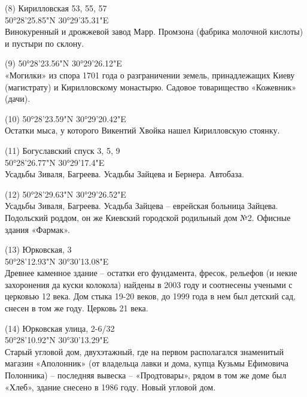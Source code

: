 \begin{flushleft}
\medskip

(8) Кирилловская 53, 55, 57\\
50°28'25.85"N 30°29'35.31"E\\
Винокуренный и дрожжевой завод Марр. Промзона (фабрика молочной кислоты) и пустыри по склону.\\

\medskip

(9) 50°28'23.56"N 30°29'26.12"E\\
«Могилки» из спора 1701 года о разграничении земель, принадлежащих Киеву (магистрату) и Кирилловскому монастырю. Садовое товарищество «Кожевник» (дачи).\\

\medskip

(10) 50°28'23.59"N 30°29'20.42"E\\
Остатки мыса, у которого Викентий Хвойка нашел Кирилловскую стоянку.\\

\medskip

(11) Богуславский спуск 3, 5, 9\\
50°28'26.77"N 30°29'17.4"E\\
Усадьбы Зиваля, Багреева. Усадьбы Зайцева и Бернера. Автобаза.\\

\medskip

(12) 50°28'29.63"N 30°29'26.52"E\\
Усадьбы Зиваля, Багреева. Усадьба Зайцева – еврейская больница Зайцева. Подольский роддом, он же Киевский городской родильный дом №2. Офисные здания «Фармак».\\

\medskip

(13) Юрковская, 3\\
50°28'12.93"N 30°30'13.08"E\\
Древнее каменное здание – остатки его фундамента, фресок, рельефов (и некие захоронения да куски колокола) найдены в 2003 году и соотнесены учеными с церковью 12 века. Дом стыка 19-20 веков, до 1999 года в нем был детский сад, снесен в том же году. Церковь 21 века.\\

\medskip

(14) Юрковская улица, 2-6/32\\
50°28'10.92"N 30°30'13.29"E\\
Старый угловой дом, двухэтажный, где на первом располагался знаменитый магазин «Аполонник» (от владельца лавки и дома, купца Кузьмы Ефимовича Полонника) – последняя вывеска – «Продтовары», рядом в том же доме был «Хлеб», здание снесено в 1986 году. Новый угловой дом.\\


\end{flushleft}
